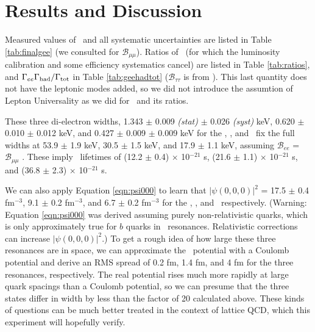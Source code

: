 \documentclass[aps,prd,preprint,superscriptaddress,tightenlines,nofootinbib,floatfix]{revtex4}
\begin{document}
%
\section{Results and Discussion}
%

Measured values of \gee\ and all systematic uncertainties are listed
in Table \ref{tab:finalgee} (we consulted \cite{istvan} for
$\mathcal{B}_{\mu\mu}$).  Ratios of \gee\ (for which the luminosity
calibration and some efficiency systematics cancel) are listed in
Table \ref{tab:ratios}, and
$\Gamma_{ee}\Gamma_{\mbox{\scriptsize had}}/\Gamma_{\mbox{\scriptsize tot}}$ in Table
\ref{tab:geehadtot} ($\mathcal{B}_{\tau\tau}$ is from \cite{jean}).
This last quantity does not have the leptonic modes added, so we did
not introduce the assumtion of Lepton Universality as we did for \gee\
and its ratios.

These three di-electron widths, 1.343 $\pm$ 0.009 {\it (stat)} $\pm$
0.026 {\it (syst)} keV, 0.620 $\pm$ 0.010 $\pm$ 0.012 keV, and 0.427
$\pm$ 0.009 $\pm$ 0.009 keV for the \uone, \utwo, and \uthree\ fix the
full widths at 53.9 $\pm$ 1.9 keV, 30.5 $\pm$ 1.5 keV, and 17.9 $\pm$
1.1 keV, assuming $\mathcal{B}_{ee}$ = $\mathcal{B}_{\mu\mu}$
\cite{istvan}.  These imply \ups\ lifetimes of (12.2 $\pm$ 0.4)
$\times$ 10$^{-21}$ s, (21.6 $\pm$ 1.1) $\times$ 10$^{-21}$ s, and
(36.8 $\pm$ 2.3) $\times$ 10$^{-21}$ s.

We can also apply Equation \ref{eqn:psi000} to learn that
$|\psi(0,0,0)|^2$ = 17.5 $\pm$ 0.4 fm$^{-3}$, 9.1 $\pm$ 0.2 fm$^{-3}$,
and 6.7 $\pm$ 0.2 fm$^{-3}$ for the \uone, \utwo, and \uthree\
respectively.  (Warning: Equation \ref{eqn:psi000} was derived
assuming purely non-relativistic quarks, which is only approximately
true for $b$ quarks in \ups\ resonances.  Relativistic corrections can
increase $|\psi(0,0,0)|^2$.)  To get a rough idea of how large these
three resonances are in space, we can approximate the \bbar\ potential
with a Coulomb potential and derive an RMS spread of 0.2 fm, 1.4 fm,
and 4 fm for the three resonances, respectively.  The real potential
rises much more rapidly at large quark spacings than a Coulomb
potential, so we can presume that the three states differ in width by
less than the factor of 20 calculated above.  These kinds of questions
can be much better treated in the context of lattice QCD, which this
experiment will hopefully verify.

%
\end{document}
